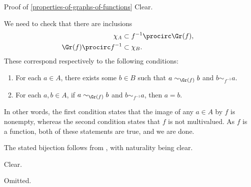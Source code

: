 \begin{Proof}{Proof of \cref{properties-of-graphs-of-functions}}%
    Clear.

    We need to check that there are inclusions
    \begin{align*}
        \chi_{A}              &\subset f^{-1}\procirc\Gr(f),\\
        \Gr(f)\procirc f^{-1} &\subset \chi_{B}.
    \end{align*}
    These correspond respectively to the following conditions:
    \begin{enumerate}
        \item\label{proof-of-properties-of-graphs-of-functions-adjointness-inside-sfbfrel-1}For each $a\in A$, there exists some $b\in B$ such that $a\sim_{\Gr(f)}b$ and $b\sim_{f^{-1}}a$.
        \item\label{proof-of-properties-of-graphs-of-functions-adjointness-inside-sfbfrel-2}For each $a,b\in A$, if $a\sim_{\Gr(f)}b$ and $b\sim_{f^{-1}}a$, then $a=b$.
    \end{enumerate}
    In other words, the first condition states that the image of any $a\in A$ by $f$ is nonempty, whereas the second condition states that $f$ is not multivalued. As $f$ is a function, both of these statements are true, and we are done.

    The stated bijection follows from , with naturality being clear.

    Clear.

    Omitted.


\end{Proof}
